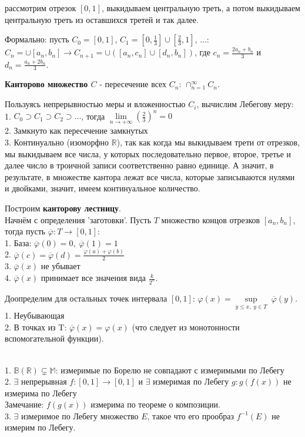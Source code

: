 
\Idea рассмотрим отрезок $[0, 1]$, выкидываем центральную треть, а потом выкидываем центральную треть из оставшихся третей и так далее.

Формально: пусть $C_0 = [0, 1]$, $C_1 = [0, \frac{1}{3}]\cup[\frac{2}{3}, 1]$, ...: $C_n = \cup [a_n, b_n] \rightarrow C_{n+1} = \cup([a_n, c_n]\cup[d_n, b_n])$, где $c_n = \frac{2a_n+b_n}{3}$ и $d_n = \frac{a_n+2b_n}{3}$.

\Def \textbf{Канторово множество $C$} - пересечение всех $C_n$: $\cap_{n=1}^\infty C_n$.

Пользуясь непрерывностью меры и вложенностью $C_i$, вычислим Лебегову меру:\\
1. $C_0 \supset C_1 \supset C_2 \supset ...$, тогда $\lim\limits_{n\to +\infty} (\frac{2}{3})^n=0$\\
2. Замкнуто как пересечение замкнутых\\
3. Континуально (изоморфно $\mathds{R}$), так как когда мы выкидываем трети от отрезков, мы выкидываем все числа, у которых последовательно первое, второе, третье и далее число в троичной записи соответственно равно единице. А значит, в результате, в множестве кантора лежат все числа, которые записываются нулями и двойками, значит, имеем континуальное количество.

Построим \textbf{канторову лестницу}.\\
Начнём с определения 'заготовки'. Пусть $T$ \textendash\; множество концов отрезков $[a_n, b_n]$, тогда пусть $\overline{\varphi}: T \rightarrow [0, 1]$: \\
1. База: $\overline{\varphi}(0) = 0,\; \overline{\varphi}(1) = 1$ \\
2. $\overline{\varphi}(c) =  \overline{\varphi}(d) = \frac{\varphi(a) + \varphi(b)}{2}$\\
3. $\overline{\varphi}(x)$ не убывает\\
4. $\overline{\varphi}(x)$ принимает все значения вида $\frac{k}{2^n}$.

Доопределим для остальных точек интервала $[0, 1]$:
$\varphi(x) = \sup\limits_{y \leq x,\; y \in T} \; \overline{\varphi}(y)$. \\
1. Неубывающая \\
2. В точках из T: $\overline{\varphi}(x) = \varphi(x)$ (что следует из монотонности вспомогательной функции).

\Th \\
1. $\mathds{B}(\mathds{R}) \subsetneq \mathds{M}$: измеримые по Борелю не совпадают с измеримыми по Лебегу \\
2. $\exists$ непрерывная $f: [0, 1]  \rightarrow  [0, 1]$ и  $\exists$ измеримая по Лебегу $g: g(f(x))$ не измерима по Лебегу \\
Замечание: $f(g(x))$ измерима по теореме о композиции.\\
3. $\exists$ измеримое по Лебегу множество $E$, такое что его прообраз $f^{-1}(E)$ не измерим по Лебегу. 

